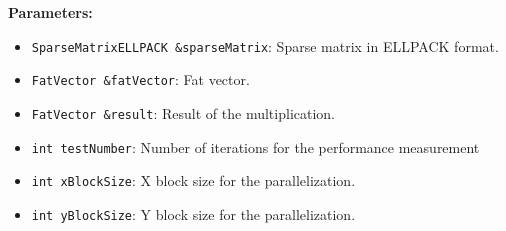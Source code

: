 \documentclass[12pt,oneside]{book} %
\begin{document}
\begin{subappendices}
    \textbf{Parameters:}
    \begin{itemize}
        \item \texttt{SparseMatrixELLPACK \&sparseMatrix}: Sparse matrix in ELLPACK format.
        \item \texttt{FatVector \&fatVector}: Fat vector.
        \item \texttt{FatVector \&result}: Result of the multiplication.
        \item \texttt{int testNumber}: Number of iterations for the performance measurement
        \item \texttt{int xBlockSize}: X block size for the parallelization.
        \item \texttt{int yBlockSize}: Y block size for the parallelization.
    \end{itemize}


\end{subappendices}
\end{document}
